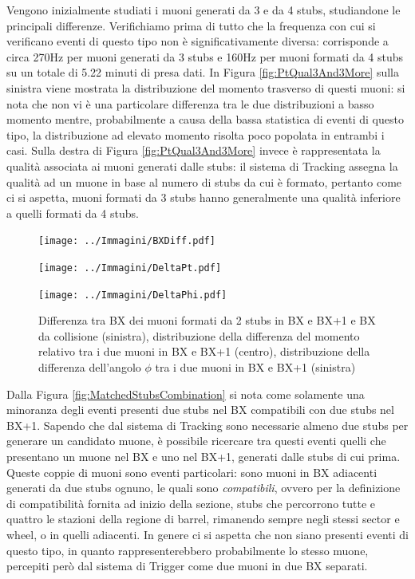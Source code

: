 Vengono inizialmente studiati i muoni generati da 3 e da 4 stubs, studiandone le principali differenze. Verifichiamo prima di tutto che la frequenza con cui si verificano eventi di questo tipo non è significativamente diversa: corrisponde a circa 270Hz per muoni generati da 3 stubs e 160Hz per muoni formati da 4 stubs su un totale di 5.22 minuti di presa dati. In Figura \ref{fig:PtQual3And3More} sulla sinistra viene mostrata la distribuzione del momento trasverso di questi muoni: si nota che non vi è una particolare differenza tra le due distribuzioni a basso momento mentre, probabilmente a causa della bassa statistica di eventi di questo tipo, la distribuzione ad elevato momento risolta poco popolata in entrambi i casi. Sulla destra di Figura \ref{fig:PtQual3And3More} invece è rappresentata la qualità associata ai muoni generati dalle stubs: il sistema di Tracking assegna la qualità ad un muone in base al numero di stubs da cui è formato, pertanto come ci si aspetta, muoni formati da 3 stubs hanno generalmente una qualità inferiore a quelli formati da 4 stubs.


\begin{figure}[t]
  \centering
  \begin{minipage}{0.33\textwidth}
      \centering
      \texttt{[image: ../Immagini/BXDiff.pdf]}
  \end{minipage}%
  \hfill %
  \begin{minipage}{0.33\textwidth}
      \centering
      \texttt{[image: ../Immagini/DeltaPt.pdf]}
  \end{minipage}%
  \hfill
  \begin{minipage}{0.33\textwidth}
      \centering
      \texttt{[image: ../Immagini/DeltaPhi.pdf]}
  \end{minipage}
  \caption{Differenza tra BX dei muoni formati da 2 stubs in BX e BX+1 e BX da collisione (sinistra), distribuzione della differenza del momento relativo tra i due muoni in BX e BX+1 (centro), distribuzione della differenza dell'angolo $\phi$ tra i due muoni in BX e BX+1 (sinistra)}
  \label{fig:BXDiffAndPt}
\end{figure}

Dalla Figura \ref{fig:MatchedStubsCombination} si nota come solamente una minoranza degli eventi presenti due stubs nel BX compatibili con due stubs nel BX+1. Sapendo che dal sistema di Tracking sono necessarie almeno due stubs per generare un candidato muone, è possibile ricercare tra questi eventi quelli che presentano un muone nel BX e uno nel BX+1, generati dalle stubs di cui prima. \newline
Queste coppie di muoni sono eventi particolari: sono muoni in BX adiacenti generati da due stubs ognuno, le quali sono \textit{compatibili}, ovvero per la definizione di compatibilità fornita ad inizio della sezione, stubs che percorrono tutte e quattro le stazioni della regione di barrel, rimanendo sempre negli stessi sector e wheel, o in quelli adiacenti. In genere ci si aspetta che non siano presenti eventi di questo tipo, in quanto rappresenterebbero probabilmente lo stesso muone, percepiti però dal sistema di Trigger come due muoni in due BX separati.

